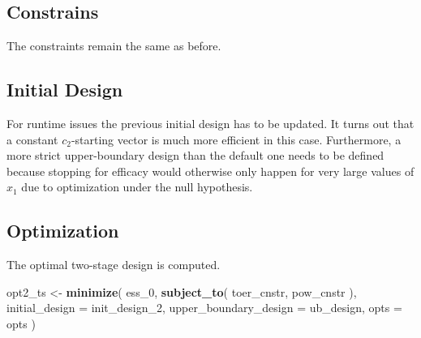 \documentclass[]{book}
\newenvironment{Shaded}{\begin{snugshade}}{\end{snugshade}}
\newcommand{\DataTypeTok}[1]{\textcolor[rgb]{0.13,0.29,0.53}{#1}}
\newcommand{\DecValTok}[1]{\textcolor[rgb]{0.00,0.00,0.81}{#1}}
\newcommand{\FloatTok}[1]{\textcolor[rgb]{0.00,0.00,0.81}{#1}}
\newcommand{\KeywordTok}[1]{\textcolor[rgb]{0.13,0.29,0.53}{\textbf{#1}}}
\newcommand{\NormalTok}[1]{#1}
\newcommand{\OperatorTok}[1]{\textcolor[rgb]{0.81,0.36,0.00}{\textbf{#1}}}
\newcommand{\StringTok}[1]{\textcolor[rgb]{0.31,0.60,0.02}{#1}}
\begin{document}
\hypertarget{constrains-1}{%
\subsection{Constrains}\label{constrains-1}}

The constraints remain the same as before.

\hypertarget{initial-design-1}{%
\subsection{Initial Design}\label{initial-design-1}}

For runtime issues the previous initial design has to be updated.
It turns out that a constant \(c_2\)-starting vector is much more efficient
in this case.
Furthermore, a more strict upper-boundary design than the default one needs
to be defined because stopping for efficacy would otherwise only happen
for very large values of \(x_1\) due to optimization under the null hypothesis.

\begin{Shaded}
\end{Shaded}

\hypertarget{optimization-1}{%
\subsection{Optimization}\label{optimization-1}}

The optimal two-stage design is computed.

\begin{Shaded}
\begin{Highlighting}[]
\NormalTok{opt2_ts <-}\StringTok{ }\KeywordTok{minimize}\NormalTok{(}
\NormalTok{        ess_}\DecValTok{0}\NormalTok{,}
        \KeywordTok{subject_to}\NormalTok{(}
\NormalTok{            toer_cnstr,}
\NormalTok{            pow_cnstr}
\NormalTok{        ),}
        \DataTypeTok{initial_design =}\NormalTok{ init_design_}\DecValTok{2}\NormalTok{,}
        \DataTypeTok{upper_boundary_design =}\NormalTok{ ub_design,}
        \DataTypeTok{opts =}\NormalTok{ opts}
\NormalTok{)}
\end{Highlighting}
\end{Shaded}
\end{document}
